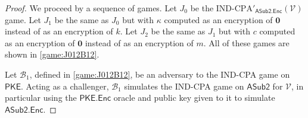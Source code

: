\begin{proof}

We proceed by a sequence of games. Let $J_0$ be the $\mathrm{IND}\text{-}\mathrm{CPA}'_{\mathsf{ASub2.Enc}}(\mathcal{V})$ game. Let $J_1$ be the same as $J_0$ but with $\kappa$ computed as an encryption of $\mathbf{0}$ instead of as an encryption of $k$. Let $J_2$ be the same as $J_1$ but with $c$ computed as an encryption of $\mathbf{0}$ instead of as an encryption of $m$. All of these games are shown in \autoref{game:J012B12}.

Let $\mathcal{B}_1$, defined in \autoref{game:J012B12}, be an adversary to the IND-CPA game on $\mathsf{PKE}$. Acting as a challenger, $\mathcal{B}_1$ simulates the IND-CPA game on $\mathsf{ASub2}$ for $\mathcal{V}$, in particular using the $\mathsf{PKE.Enc}$ oracle and public key given to it to simulate $\mathsf{ASub2.Enc}$.


\end{proof}
